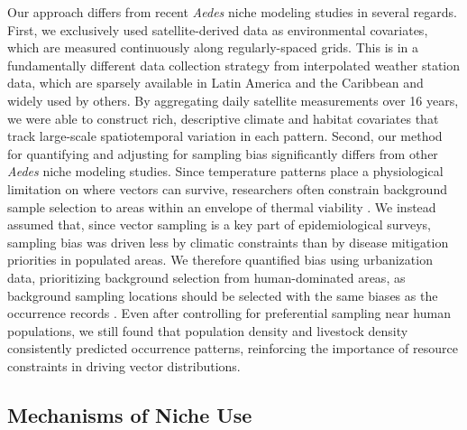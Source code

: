Our approach differs from recent \textit{Aedes} niche modeling studies in several regards. First, we exclusively used satellite-derived data as environmental covariates, which are measured continuously along regularly-spaced grids. This is in a fundamentally different data collection strategy from interpolated weather station data, which are sparsely available in Latin America and the Caribbean \cite{Fick2017-am} and widely used by others. By aggregating daily satellite measurements over 16 years, we were able to construct rich, descriptive climate and habitat covariates that track large-scale spatiotemporal variation in each pattern. Second, our method for quantifying and adjusting for sampling bias significantly differs from other \textit{Aedes} niche modeling studies. Since temperature patterns place a physiological limitation on where vectors can survive, researchers often constrain background sample selection to areas within an envelope of thermal viability \cite{Brady2012-tg, Bhatt2013-qa, Kraemer2015-ct}. We instead assumed that, since vector sampling is a key part of epidemiological surveys, sampling bias was driven less by climatic constraints than by disease mitigation priorities in populated areas. We therefore quantified bias using urbanization data, prioritizing background selection from human-dominated areas, as background sampling locations should be selected with the same biases as the occurrence records \cite{Phillips2009-nf, Barbet-Massin2012-pn, Fourcade2018-ws}. Even after controlling for preferential sampling near human populations, we still found that population density and livestock density consistently predicted occurrence patterns, reinforcing the importance of resource constraints in driving vector distributions.

\subsection{Mechanisms of Niche Use}


